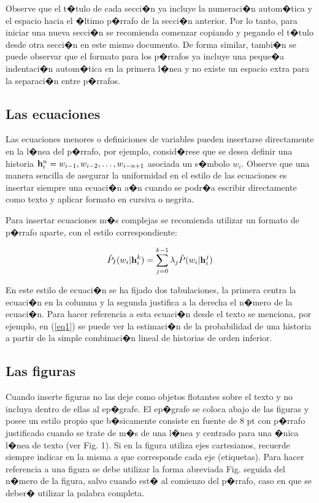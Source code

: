 \documentclass[conference,a4paper,10pt,oneside,final]{tfmpd}
\begin{document}
Observe que el t�tulo de cada secci�n ya incluye la numeraci�n autom�tica y el espacio hacia el �ltimo p�rrafo de la 
secci�n anterior. Por lo tanto, para iniciar una nueva secci�n se recomienda comenzar copiando y pegando el t�tulo desde otra secci�n en este mismo documento. De forma similar, tambi�n se puede observar que el formato para los p�rrafos ya incluye una peque�a indentaci�n autom�tica en la primera l�nea y no existe un espacio extra para la 
separaci�n entre p�rrafos.

\subsection{Las ecuaciones}
Las ecuaciones menores o definiciones de variables pueden insertarse directamente en la l�nea del p�rrafo, por ejemplo, consid�rese que se desea definir una historia ${\rm {\bf h}}_i^n = w_{i - 1} ,w_{i - 2}, \ldots,w_{i - n + 1} $ asociada un s�mbolo $w_i $. Observe que una manera sencilla de asegurar la uniformidad en el estilo de las ecuaciones es insertar siempre una ecuaci�n a�n cuando se podr�a escribir directamente como texto y aplicar formato en cursiva o negrita.

Para insertar ecuaciones m�s complejas se recomienda utilizar un formato de p�rrafo aparte, con el estilo correspondiente:

\begin{equation}
\label{eq1}
\hat {P}_I (w_i \vert {\rm {\bf h}}_i^k ) = \sum\limits_{j=0}^{k-1} 
{\lambda _j \hat {P}(w_i \vert {\rm {\bf h}}_i^j )} 
\end{equation}

En este estilo de ecuaci�n se ha fijado dos tabulaciones, la primera centra la ecuaci�n en la columna y la segunda justifica a la derecha el n�mero de la ecuaci�n. Para hacer referencia a esta ecuaci�n desde el texto se menciona, por ejemplo, en (\ref{eq1}) se puede ver la estimaci�n de la probabilidad de una historia a partir de la simple combinaci�n lineal de historias de orden inferior.

\subsection{Las figuras}

Cuando inserte figuras no las deje como objetos flotantes sobre el texto y no incluya dentro de ellas al ep�grafe. El ep�grafe se coloca abajo de las figuras y posee un estilo propio que b�sicamente consiste en fuente de 8 pt con p�rrafo justificado cuando se trate de m�s de una l�nea y centrado para una �nica l�nea de texto (ver Fig. 1). Si en la figura utiliza ejes cartesianos, recuerde siempre indicar en la misma a que corresponde cada eje (etiquetas). Para hacer referencia a una figura se debe utilizar la forma abreviada Fig. seguida del n�mero de la figura, salvo cuando est� al comienzo del p�rrafo, caso en que se deber� utilizar la palabra completa.
\end{document}
